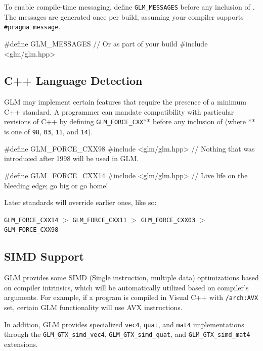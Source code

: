 \documentclass{scrartcl}
\numberwithin{figure}{subsection}
\begin{document}
To enable compile-time messaging, define \verb|GLM_MESSAGES| before any inclusion of . The messages are generated once per build, assuming your compiler supports \verb|#pragma message|.

\begin{cppcode}
#define GLM_MESSAGES  // Or as part of your build
#include <glm/glm.hpp>
\end{cppcode}

\subsection{C++ Language Detection}

GLM may implement certain features that require the presence of a minimum C++ standard. A programmer can mandate compatibility with particular revisions of C++ by defining \verb|GLM_FORCE_CXX|** before any inclusion of  (where ** is one of \verb|98|, \verb|03|, \verb|11|, and \verb|14|).

\begin{cppcode}
#define GLM_FORCE_CXX98 
#include <glm/glm.hpp>
// Nothing that was introduced after 1998 will be used in GLM.
\end{cppcode}

\begin{cppcode}
#define GLM_FORCE_CXX14 
#include <glm/glm.hpp>
// Live life on the bleeding edge; go big or go home!
\end{cppcode}

Later standards will override earlier ones, like so:

\verb|GLM_FORCE_CXX14| $>$ \verb|GLM_FORCE_CXX11| $>$ \verb|GLM_FORCE_CXX03| $>$ \verb|GLM_FORCE_CXX98|

\subsection{SIMD Support}

GLM provides some SIMD (Single instruction, multiple data) optimizations based on compiler intrinsics, which will be automatically utilized based on compiler's arguments. For example, if a program is compiled in Visual C++ with \verb|/arch:AVX| set, certain GLM functionality will use AVX instructions.

In addition, GLM provides specialized \verb|vec4|, \verb|quat|, and \verb|mat4| implementations through the \verb|GLM_GTX_simd_vec4|, \verb|GLM_GTX_simd_quat|, and \verb|GLM_GTX_simd_mat4| extensions.
\end{document}
